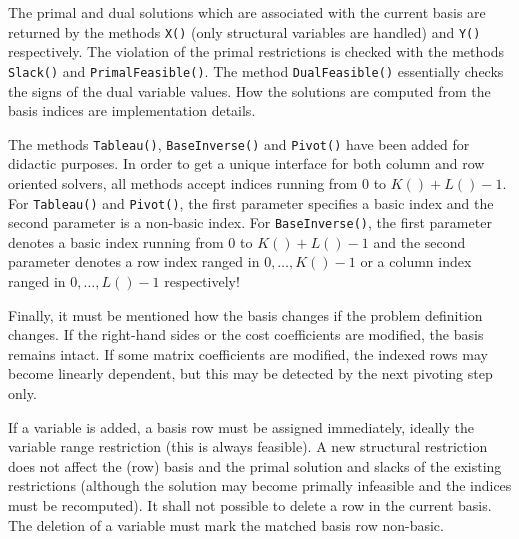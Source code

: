 \documentclass[a4paper,11pt,twoside]{book}
\begin{document}
\begin{multicols}{2}
The primal and dual solutions which are associated with the current basis are
returned by the methods \verb/X()/ (only structural variables are handled) and
\verb/Y()/ respectively. The violation
of the primal restrictions is checked with the methods \verb/Slack()/ and
\verb/PrimalFeasible()/. The method \verb/DualFeasible()/ essentially checks
the signs of the dual variable values. How the solutions are computed from the
basis indices are implementation details.

The methods \verb/Tableau()/, \verb/BaseInverse()/ and \verb/Pivot()/ have been
added for didactic purposes. In order to get a unique interface for both column
and row oriented solvers, all methods accept indices running from $0$ to
$K()+L()-1$. For \verb/Tableau()/ and \verb/Pivot()/, the first parameter
specifies a basic index and the second parameter is a non-basic index.
For \verb/BaseInverse()/, the first parameter denotes a basic index running
from $0$ to $K()+L()-1$ and the second parameter denotes a row index ranged in
$0,\dots,K()-1$ or a column index ranged in $0,\dots,L()-1$ respectively!

Finally, it must be mentioned how the basis changes if the problem definition
changes. If the right-hand sides or the cost coefficients are modified, the
basis remains intact. If some matrix coefficients are modified,
the indexed rows may become linearly dependent, but this may be detected by
the next pivoting step only.

If a variable is added, a basis row must be assigned immediately, ideally the
variable range restriction (this is always feasible). A new structural
restriction does not affect the (row) basis and the primal solution and slacks
of the existing restrictions (although the solution may become primally
infeasible and the indices must be recomputed). It shall not possible to delete
a row in the current basis. The deletion of a variable must mark the matched
basis row non-basic.


\newpage

\end{multicols}
\end{document}
